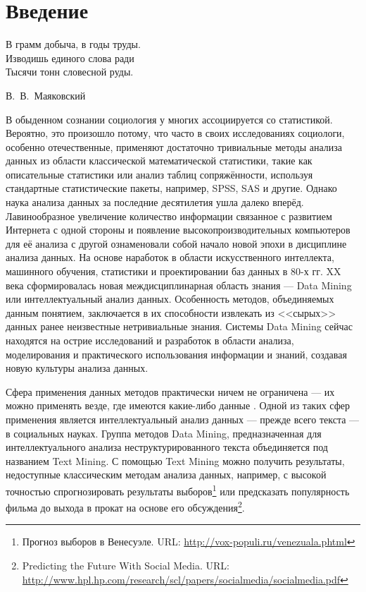 \chapter*{Введение}							%
\epigraph{В грамм добыча, в годы труды.\\
Изводишь единого слова ради\\
Тысячи тонн словесной руды.}{В.~В.~Маяковский}

В обыденном сознании социология у многих ассоциируется со статистикой. Вероятно, это произошло потому, что часто в своих исследованиях социологи, особенно отечественные, применяют достаточно тривиальные методы анализа данных из области классической математической статистики, такие как описательные статистики или анализ таблиц сопряжённости, используя стандартные статистические пакеты, например, SPSS, SAS и другие. Однако наука анализа данных за последние десятилетия ушла далеко вперёд. Лавинообразное увеличение количество информации связанное с развитием Интернета с одной стороны и появление высокопроизводительных компьютеров для её анализа с другой ознаменовали собой начало новой эпохи в дисциплине анализа данных. На основе наработок в области искусственного интеллекта, машинного обучения, статистики и проектировании баз данных в 80-х гг. XX века сформировалась новая междисциплинарная область знания --- Data Mining или интеллектуальный анализ данных. Особенность методов, объединяемых данным понятием, заключается в их способности извлекать из <<сырых>> данных ранее неизвестные нетривиальные знания. Системы Data Mining сейчас находятся на острие исследований и разработок в области анализа, моделирования и практического использования информации и знаний, создавая новую культуры анализа данных.

Сфера применения данных методов практически ничем не ограничена --- их можно применять везде, где имеются какие-либо данные \cite[стр. 81]{Duk2011}. Одной из таких сфер применения является интеллектуальный анализ данных --- прежде всего текста --- в социальных науках. Группа методов Data Mining, предназначенная для интеллектуального анализа неструктурированного текста объединяется под названием Text Mining. С помощью Text Mining можно получить результаты, недоступные классическим методам анализа данных, например, с высокой точностью спрогнозировать результаты выборов\footnote{Прогноз выборов в Венесуэле. URL: \url{http://vox-populi.ru/venezuala.phtml}} или предсказать популярность фильма до выхода в прокат на основе его обсуждения\footnote{Predicting the Future With Social Media. URL: \url{http://www.hpl.hp.com/research/scl/papers/socialmedia/socialmedia.pdf}}. 

